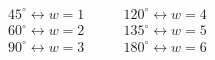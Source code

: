 \documentclass[preview]{standalone}
\begin{document}
\begin{align*}
\begin{aligned}
            45^\circ \leftrightarrow w=1 &\qquad 120^\circ \leftrightarrow w=4&\\[0.2cm]
            60^\circ \leftrightarrow w=2 &\qquad 135^\circ \leftrightarrow w=5&\\[0.2cm]
            90^\circ \leftrightarrow w=3 &\qquad 180^\circ \leftrightarrow w=6&
            \end{aligned}
\end{align*}
\end{document}
